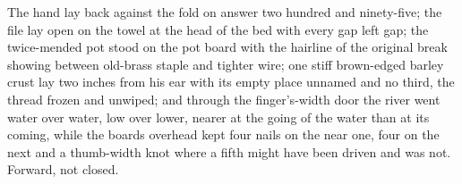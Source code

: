 The hand lay back against the fold on answer two hundred and ninety-five; the file lay open on the towel at the head of the bed with every gap left gap; the twice-mended pot stood on the pot board with the hairline of the original break showing between old-brass staple and tighter wire; one stiff brown-edged barley crust lay two inches from his ear with its empty place unnamed and no third, the thread frozen and unwiped; and through the finger's-width door the river went water over water, low over lower, nearer at the going of the water than at its coming, while the boards overhead kept four nails on the near one, four on the next and a thumb-width knot where a fifth might have been driven and was not. Forward, not closed.
